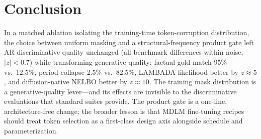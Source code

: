 \documentclass{article}
\begin{document}
\section{Conclusion}

In a matched ablation isolating the training-time token-corruption distribution, the
choice between uniform masking and a structural-frequency product gate left AR
discriminative quality unchanged (all benchmark differences within noise,
$|z| < 0.7$) while transforming generative quality: factual gold-match 95\% vs.\
12.5\%, period collapse 2.5\% vs.\ 82.5\%, LAMBADA likelihood better by $z \approx 5$,
and diffusion-native NELBO better by $z \approx 10$. The training mask distribution is
a generative-quality lever---and its effects are invisible to the discriminative
evaluations that standard suites provide. The product gate is a one-line,
architecture-free change; the broader lesson is that MDLM fine-tuning recipes should
treat token selection as a first-class design axis alongside schedule and
parameterization.
\end{document}

